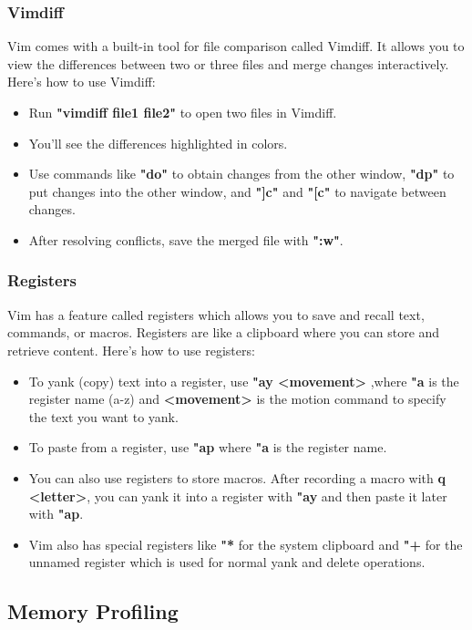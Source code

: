 \documentclass[titlepage]{article}
\begin{document}
\subsubsection{Vimdiff}
Vim comes with a built-in tool for file comparison called Vimdiff. It allows you to view the differences between two or three files and merge changes interactively. Here's how to use Vimdiff:

\begin{itemize}
\item Run \textbf{"vimdiff file1 file2"} to open two files in Vimdiff.
\item You'll see the differences highlighted in colors.
\item Use commands like \textbf{"do"} to obtain changes from the other window, \textbf{"dp"} to put changes into the other window, and\textbf{ "]c"} and \textbf{"[c"} to navigate between changes.
\item After resolving conflicts, save the merged file with \textbf{":w"}.
\end{itemize}

\subsubsection{Registers}
Vim has a feature called registers which allows you to save and recall text, commands, or macros. Registers are like a clipboard where you can store and retrieve content. Here's how to use registers:

\begin{itemize}
\item To yank (copy) text into a register, use \textbf{"ay <movement>} ,where \textbf{"a} is the register name (a-z) and \textbf{<movement>} is the motion command to specify the text you want to yank.
\item To paste from a register, use \textbf{"ap} where \textbf{"a} is the register name.
\item You can also use registers to store macros. After recording a macro with \textbf{q <letter>}, you can yank it into a register with \textbf{"ay} and then paste it later with \textbf{"ap}.
\item Vim also has special registers like \textbf{"*} for the system clipboard and \textbf{"+} for the unnamed register which is used for normal yank and delete operations.
\end{itemize}

\subsection{Memory Profiling}
\end{document}

